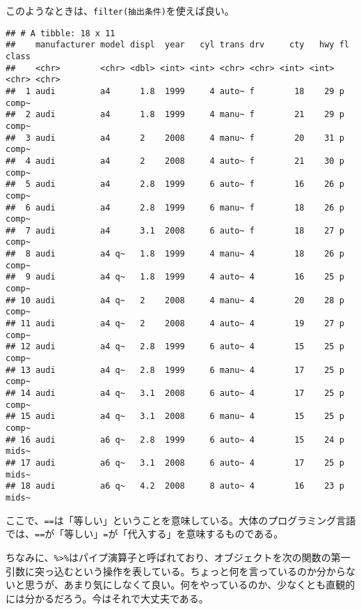 \documentclass[]{book}
\newenvironment{Shaded}{\begin{snugshade}}{\end{snugshade}}
\newcommand{\KeywordTok}[1]{\textcolor[rgb]{0.13,0.29,0.53}{\textbf{#1}}}
\newcommand{\StringTok}[1]{\textcolor[rgb]{0.31,0.60,0.02}{#1}}
\newcommand{\CommentTok}[1]{\textcolor[rgb]{0.56,0.35,0.01}{\textit{#1}}}
\newcommand{\OperatorTok}[1]{\textcolor[rgb]{0.81,0.36,0.00}{\textbf{#1}}}
\newcommand{\NormalTok}[1]{#1}
\begin{document}
このようなときは、\texttt{filter(抽出条件)}を使えば良い。

\begin{Shaded}
\end{Shaded}

\begin{verbatim}
## # A tibble: 18 x 11
##    manufacturer model displ  year   cyl trans drv     cty   hwy fl    class
##    <chr>        <chr> <dbl> <int> <int> <chr> <chr> <int> <int> <chr> <chr>
##  1 audi         a4      1.8  1999     4 auto~ f        18    29 p     comp~
##  2 audi         a4      1.8  1999     4 manu~ f        21    29 p     comp~
##  3 audi         a4      2    2008     4 manu~ f        20    31 p     comp~
##  4 audi         a4      2    2008     4 auto~ f        21    30 p     comp~
##  5 audi         a4      2.8  1999     6 auto~ f        16    26 p     comp~
##  6 audi         a4      2.8  1999     6 manu~ f        18    26 p     comp~
##  7 audi         a4      3.1  2008     6 auto~ f        18    27 p     comp~
##  8 audi         a4 q~   1.8  1999     4 manu~ 4        18    26 p     comp~
##  9 audi         a4 q~   1.8  1999     4 auto~ 4        16    25 p     comp~
## 10 audi         a4 q~   2    2008     4 manu~ 4        20    28 p     comp~
## 11 audi         a4 q~   2    2008     4 auto~ 4        19    27 p     comp~
## 12 audi         a4 q~   2.8  1999     6 auto~ 4        15    25 p     comp~
## 13 audi         a4 q~   2.8  1999     6 manu~ 4        17    25 p     comp~
## 14 audi         a4 q~   3.1  2008     6 auto~ 4        17    25 p     comp~
## 15 audi         a4 q~   3.1  2008     6 manu~ 4        15    25 p     comp~
## 16 audi         a6 q~   2.8  1999     6 auto~ 4        15    24 p     mids~
## 17 audi         a6 q~   3.1  2008     6 auto~ 4        17    25 p     mids~
## 18 audi         a6 q~   4.2  2008     8 auto~ 4        16    23 p     mids~
\end{verbatim}

ここで、\texttt{==}は「等しい」ということを意味している。大体のプログラミング言語では、\texttt{==}が「等しい」\texttt{=}が「代入する」を意味するものである。

ちなみに、\texttt{\%\textgreater{}\%}はパイプ演算子と呼ばれており、オブジェクトを次の関数の第一引数に突っ込むという操作を表している。ちょっと何を言っているのか分からないと思うが、あまり気にしなくて良い。何をやっているのか、少なくとも直観的には分かるだろう。今はそれで大丈夫である。
\end{document}

